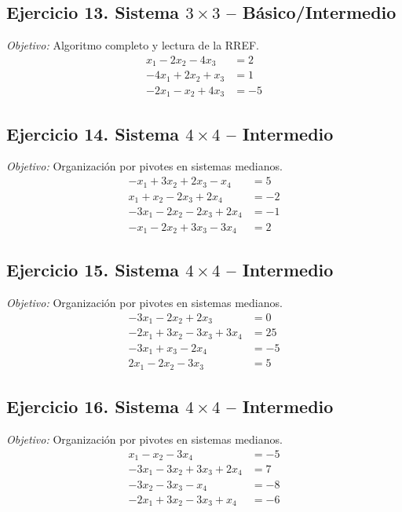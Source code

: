 \documentclass[12pt]{article}
\theoremstyle{remark}
\begin{document}
\subsection*{Ejercicio 13. Sistema $3\times3$ -- Básico/Intermedio}
\emph{Objetivo:} Algoritmo completo y lectura de la RREF.
\[
\begin{aligned}
x_{1} - 2 x_{2} - 4 x_{3} &= 2\\
- 4 x_{1} + 2 x_{2} + x_{3} &= 1\\
- 2 x_{1} - x_{2} + 4 x_{3} &= -5
\end{aligned}
\]
\subsection*{Ejercicio 14. Sistema $4\times4$ -- Intermedio}
\emph{Objetivo:} Organización por pivotes en sistemas medianos.
\[
\begin{aligned}
- x_{1} + 3 x_{2} + 2 x_{3} - x_{4} &= 5\\
x_{1} + x_{2} - 2 x_{3} + 2 x_{4} &= -2\\
- 3 x_{1} - 2 x_{2} - 2 x_{3} + 2 x_{4} &= -1\\
- x_{1} - 2 x_{2} + 3 x_{3} - 3 x_{4} &= 2
\end{aligned}
\]
\subsection*{Ejercicio 15. Sistema $4\times4$ -- Intermedio}
\emph{Objetivo:} Organización por pivotes en sistemas medianos.
\[
\begin{aligned}
- 3 x_{1} - 2 x_{2} + 2 x_{3} &= 0\\
- 2 x_{1} + 3 x_{2} - 3 x_{3} + 3 x_{4} &= 25\\
- 3 x_{1} + x_{3} - 2 x_{4} &= -5\\
2 x_{1} - 2 x_{2} - 3 x_{3} &= 5
\end{aligned}
\]
\subsection*{Ejercicio 16. Sistema $4\times4$ -- Intermedio}
\emph{Objetivo:} Organización por pivotes en sistemas medianos.
\[
\begin{aligned}
x_{1} - x_{2} - 3 x_{4} &= -5\\
- 3 x_{1} - 3 x_{2} + 3 x_{3} + 2 x_{4} &= 7\\
- 3 x_{2} - 3 x_{3} - x_{4} &= -8\\
- 2 x_{1} + 3 x_{2} - 3 x_{3} + x_{4} &= -6
\end{aligned}
\]
\end{document}
